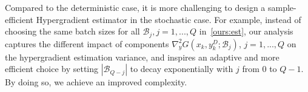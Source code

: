 \documentclass{osudissert96}
\def\gB{{\mathcal{B}}}
\def\gD{{\mathcal{D}}}
\begin{document}
Compared to the deterministic case, it is more challenging to design a sample-efficient Hypergradient estimator in the stochastic case. For example, instead of choosing the same batch sizes for all $\gB_j,j=1,...,Q$  in~\cref{ours:est}, 
 our analysis captures the different impact of components $\nabla_y^2G(x_k,y_k^D;\gB_j)$, $j=1,...,Q$ on  the hypergradient estimation variance, and inspires an adaptive and more efficient choice  by setting $|\gB_{Q-j}|$ to   decay  exponentially with  $j$ from $0$ to $Q-1$. By doing so, we  achieve an improved  complexity. 
\end{document}
